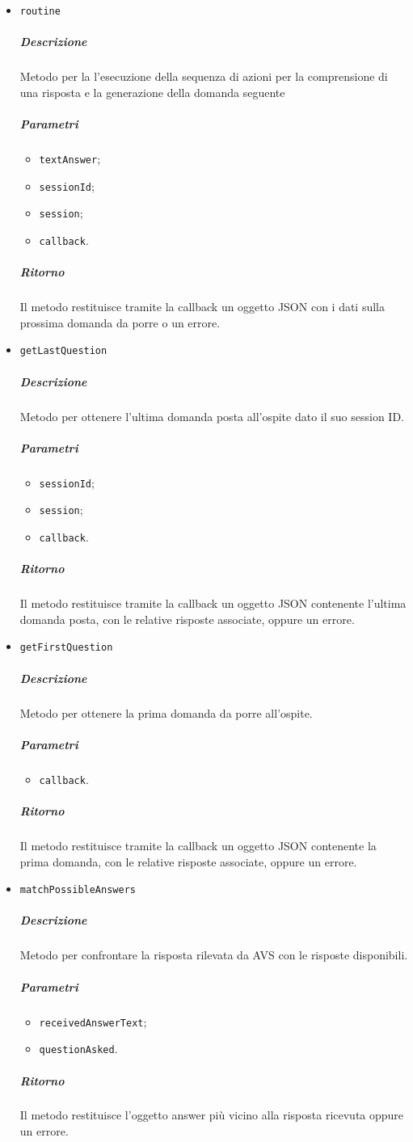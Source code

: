 \documentclass[../ManualeSviluppatore_v1.0.0.tex]{subfiles}
\begin{document}
\begin{itemize}
	\item \texttt{routine}
	      \subparagraph{Descrizione} Metodo per la l'esecuzione della sequenza di azioni per la comprensione di una risposta e la generazione della domanda seguente
	      \subparagraph{Parametri}
	      \begin{itemize}
	      	\item \texttt{textAnswer};
	      	\item \texttt{sessionId};
	      	\item \texttt{session};
	      	\item \texttt{callback}.
	      \end{itemize}
	      \subparagraph{Ritorno} Il metodo restituisce tramite la callback un oggetto JSON con i dati sulla prossima domanda da porre o un errore.

	\item \texttt{getLastQuestion}
	      \subparagraph{Descrizione} Metodo per ottenere l'ultima domanda posta all'ospite dato il suo session ID.
	      \subparagraph{Parametri}
	      \begin{itemize}
	      	\item \texttt{sessionId};
	      	\item \texttt{session};
	      	\item \texttt{callback}.
	      \end{itemize}
	      \subparagraph{Ritorno} Il metodo restituisce tramite la callback un oggetto JSON contenente l'ultima domanda posta, con le relative risposte associate, oppure un errore.

	\item \texttt{getFirstQuestion}
	      \subparagraph{Descrizione} Metodo per ottenere la prima domanda da porre all'ospite.
	      \subparagraph{Parametri}
	      \begin{itemize}
	      	\item \texttt{callback}.
	      \end{itemize}
	      \subparagraph{Ritorno} Il metodo restituisce tramite la callback un oggetto JSON contenente la prima domanda, con le relative risposte associate, oppure un errore.

	\item \texttt{matchPossibleAnswers}
	      \subparagraph{Descrizione} Metodo per confrontare la risposta rilevata da AVS con le risposte disponibili.
	      \subparagraph{Parametri}
	      \begin{itemize}
	      	\item \texttt{receivedAnswerText};
	      	\item \texttt{questionAsked}.
	      \end{itemize}
	      \subparagraph{Ritorno} Il metodo restituisce l'oggetto answer più vicino alla risposta ricevuta oppure un errore.


\end{itemize}
\end{document}
